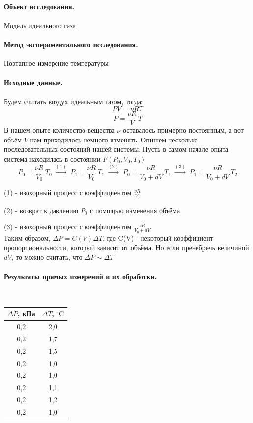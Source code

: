 \documentclass{article}
\begin{document}
\paragraph{Объект исследования.} Модель идеального газа
\paragraph{Метод экспериментального исследования.} Поэтапное измерение температуры
\paragraph{Исходные данные.}
Будем считать воздух идеальным газом, тогда:
$$PV=\nu RT $$
$$ P=\frac{\nu R}{V}\,T$$
В нашем опыте количество вещества $\nu$ оставалось примерно постоянным, а вот объём $V$ нам приходилось немного изменять. Опишем несколько последовательных состояний нашей системы.
Пусть в самом начале опыта система находилась в состоянии $F(P_0,V_0,T_0)$
$$ P_0=\frac{\nu R}{V_0}\,T_0\; \xrightarrow{(1)} \; P_1=\frac{\nu R}{V_0}\,T_1 \;\xrightarrow{(2)}\; P_0=\frac{\nu R}{V_0+dV}\,T_1 \;\xrightarrow{(3)} \; P_1=\frac{\nu R}{V_0+dV}\,T_2$$

(1) - изохорный процесс с коэффициентом $ \frac{\nu R}{V_0} $

(2) - возврат к давлению $P_0$ с помощью изменения объёма

(3) - изохорный процесс с коэффициентом $ \frac{\nu R}{V_0+dV} $\\

Таким образом, $\Delta P=C(V)\Delta T$, где C(V) - некоторый коэффициент пропорциональности, который зависит от объёма. Но если пренебречь величиной $dV$, то можно считать, что $\Delta P \sim \Delta T$

\paragraph{Результаты прямых измерений и их обработки.}

\begin{center}
	\\
	\begin{tabular}{c|c}
	$\Delta P$, кПа&$\Delta T$, $^\circ\mbox{C}$\\
	\hline
	0,2&2,0 \\
	0,2&1,7  \\
	0,2&1,5  \\
	0,2&1,0  \\
	0,2&1,0 \\
	0,2&1,1 \\
	0,2& 1,2 \\
	0,2& 1,0 \\
\end{tabular}
\end{center}
\end{document}
